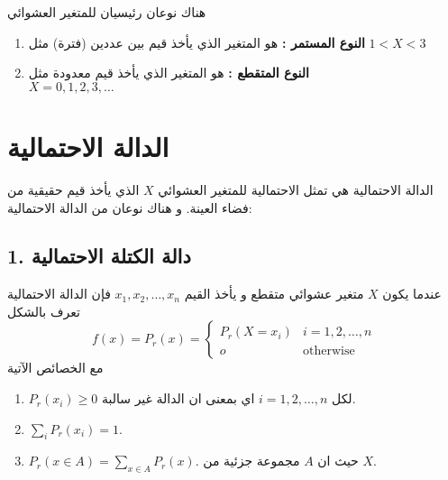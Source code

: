  	\begin{note}
 		هناك نوعان رئيسيان للمتغير العشوائي
        \begin{enumerate}[label=\textbf{\arabic*}.]
 			\item \textbf{النوع المستمر :} هو المتغير الذي يأخذ قيم بين عددين (فترة) مثل  \(1<X<3\)
 			\item \textbf{النوع المتقطع :} هو المتغير الذي يأخذ قيم معدودة مثل \\ \(X=0,1,2,3,\dots\)
 		\end{enumerate}
 	\end{note}
 	
\section[الدالة الاحتمالية]{الدالة الاحتمالية }
الدالة الاحتمالية هي تمثل الاحتمالية للمتغير العشوائي $X$ الذي يأخذ قيم حقيقية من فضاء العينة. و هناك نوعان من الدالة الاحتمالية:
 	
\subsection*{1. دالة الكتلة الاحتمالية }
عندما يكون $X$ متغير عشوائي متقطع و يأخذ القيم $x_1, x_2, \dots, x_n$ فإن الدالة الاحتمالية تعرف بالشكل
\[
f(x) = P_r(x) = \begin{cases}
	P_r(X=x_i) & i = 1,2,\dots,n \\
	o & \text{otherwise}
\end{cases}
\]
مع الخصائص الآتية 
\begin{enumerate}
	\item $P_r(x_i) \geq 0$ لكل $i=1,2,\dots,n$ اي بمعنى ان الدالة غير سالبة.
	\item $\sum_i P_r(x_i) = 1$.
	\item $P_r(x\in A) = \sum_{x\in A} P_r(x)$. حيث ان $A$ مجموعة جزئية من $X$.
\end{enumerate}

